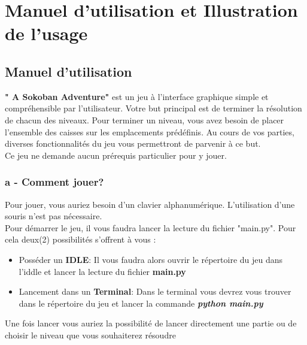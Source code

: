 \documentclass[a4paper,12pt]{article} %
\begin{document}
\newpage

\section{Manuel d'utilisation et Illustration de l'usage}
\subsection{Manuel d'utilisation}
\textbf{" A Sokoban Adventure"} est un jeu à l'interface graphique simple et compréhensible par l'utilisateur. Votre but principal est de terminer la résolution de chacun des niveaux. Pour terminer un niveau, vous avez besoin de placer l'ensemble des caisses sur les emplacements prédéfinis.
Au cours de vos parties, diverses fonctionnalités du jeu vous permettront de parvenir à ce but.\\
Ce jeu ne demande aucun prérequis particulier pour y jouer. 
\subsubsection*{a - Comment jouer?}
Pour jouer, vous auriez besoin d'un clavier alphanumérique. L'utilisation d'une souris n'est pas nécessaire.\\
Pour démarrer le jeu, il vous faudra lancer la lecture du fichier "main.py". Pour cela deux(2) possibilités s'offrent à vous :
\begin{itemize}
	\item Posséder un \textbf{IDLE}: Il vous faudra alors ouvrir le répertoire du jeu dans l'iddle et lancer la lecture du fichier \textbf{main.py}
	\item Lancement dans un \textbf{Terminal}: Dans le terminal vous devrez vous trouver dans le répertoire du jeu et lancer la commande \emph{\textbf{python main.py}}
\end{itemize}
Une fois lancer vous auriez la possibilité de lancer directement une partie ou de choisir le niveau que vous souhaiterez résoudre
\end{document}
